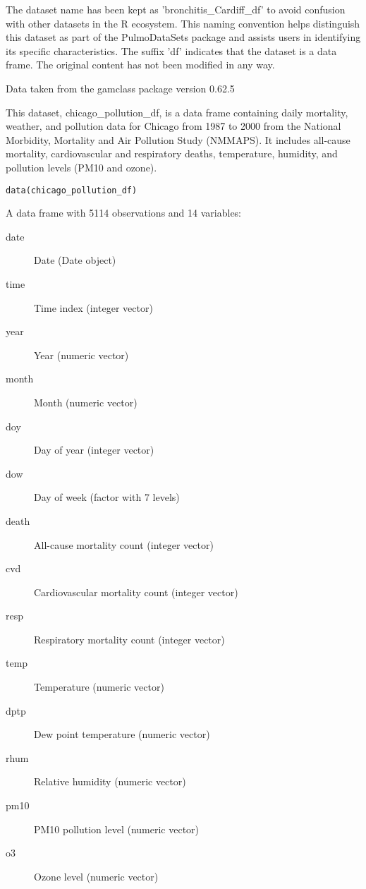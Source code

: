 \documentclass[a4paper]{book}
\begin{document}
%
\begin{Details}
The dataset name has been kept as 'bronchitis\_Cardiff\_df' to avoid confusion with other datasets
in the R ecosystem. This naming convention helps distinguish this dataset as part of the
PulmoDataSets package and assists users in identifying its specific characteristics.
The suffix 'df' indicates that the dataset is a data frame. The original content has not been modified
in any way.
\end{Details}
%
\begin{Source}
Data taken from the gamclass package version 0.62.5
\end{Source}
%
\begin{Description}
This dataset, chicago\_pollution\_df, is a data frame containing daily mortality, weather,
and pollution data for Chicago from 1987 to 2000 from the National Morbidity, Mortality
and Air Pollution Study (NMMAPS). It includes all-cause mortality, cardiovascular and
respiratory deaths, temperature, humidity, and pollution levels (PM10 and ozone).
\end{Description}
%
\begin{Usage}
\begin{verbatim}
data(chicago_pollution_df)
\end{verbatim}
\end{Usage}
%
\begin{Format}
A data frame with 5114 observations and 14 variables:
\begin{description}

\item[date] Date (Date object)
\item[time] Time index (integer vector)
\item[year] Year (numeric vector)
\item[month] Month (numeric vector)
\item[doy] Day of year (integer vector)
\item[dow] Day of week (factor with 7 levels)
\item[death] All-cause mortality count (integer vector)
\item[cvd] Cardiovascular mortality count (integer vector)
\item[resp] Respiratory mortality count (integer vector)
\item[temp] Temperature (numeric vector)
\item[dptp] Dew point temperature (numeric vector)
\item[rhum] Relative humidity (numeric vector)
\item[pm10] PM10 pollution level (numeric vector)
\item[o3] Ozone level (numeric vector)

\end{description}

\end{Format}
\end{document}
